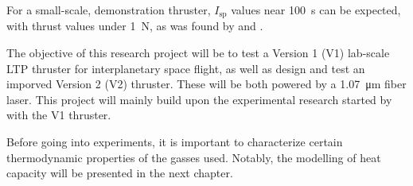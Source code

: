         For a small-scale, demonstration thruster, $I_\mathrm{sp}$ values near \qty{100}{s} can be expected, with thrust values under \qty{1}{N}, as was found by \textcite{toyodaThrustPerformanceCW2002} and \textcite{takanoDemonstrationDiodeLasersustained}.
        
        The objective of this research project will be to test a Version 1 (V1) lab-scale LTP thruster for interplanetary space flight, as well as design and test an imporved Version 2 (V2) thruster. These will be both powered by a \qty{1.07}{μm} fiber laser. This project will mainly build upon the experimental research started by \textcite{duplayArgonLaserPlasmaThruster2024a} with the V1 thruster.

        
        Before going into experiments, it is important to characterize certain thermodynamic properties of the gasses used. Notably, the modelling of heat capacity will be presented in the next chapter.
